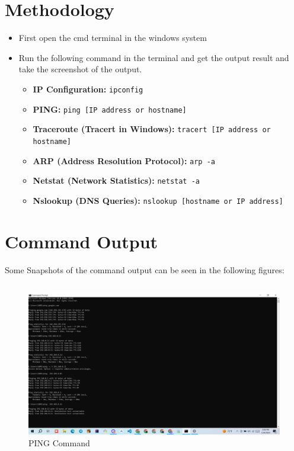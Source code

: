 \documentclass[11pt]{article}
\begin{document}
\section{Methodology}
\begin{itemize}
    \item  First open the cmd terminal in the windows system 
    \item  Run the following command in the terminal and get the output result and take the screenshot of the output.
    \begin{itemize}
    \item \textbf{IP Configuration:} \texttt{ipconfig}

    \item \textbf{PING:} \texttt{ping [IP address or hostname]}
    
    \item \textbf{Traceroute (Tracert in Windows):} \texttt{tracert [IP address or hostname]}
    
    \item \textbf{ARP (Address Resolution Protocol):} \texttt{arp -a}
    
    
    \item \textbf{Netstat (Network Statistics):} \texttt{netstat -a}
    
    \item \textbf{Nslookup (DNS Queries):} \texttt{nslookup [hostname or IP address]}
    
    
\end{itemize}

\end{itemize}


\section{Command Output}

Some Snapshots of the command output can be seen in the following figures: 

\subsection{}
\begin{figure}[!h]
\centering
\includegraphics[width=\textwidth]{Screenshot (1).png}
\caption{PING Command}
\end{figure}
\end{document}
